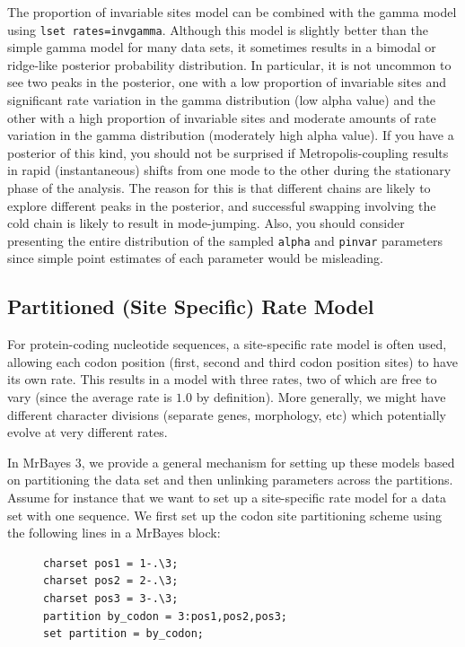 \documentclass[12pt]{book}
\begin{document}
The proportion of invariable sites model can be combined with the gamma model using \texttt{lset
rates=invgamma}. Although this model is slightly better than the simple gamma model for many data
sets, it sometimes results in a bimodal or ridge-like posterior probability distribution. In
particular, it is not uncommon to see two peaks in the posterior, one with a low proportion of
invariable sites and significant rate variation in the gamma distribution (low alpha value) and the
other with a high proportion of invariable sites and moderate amounts of rate variation in the
gamma distribution (moderately high alpha value). If you have a posterior of this kind, you should
not be surprised if Metropolis-coupling results in rapid (instantaneous) shifts from one mode to
the other during the stationary phase of the analysis. The reason for this is that different chains
are likely to explore different peaks in the posterior, and successful swapping involving the cold
chain is likely to result in mode-jumping. Also, you should consider presenting the entire
distribution of the sampled \texttt{alpha} and \texttt{pinvar} parameters since simple point
estimates of each parameter would be misleading.

\subsection{Partitioned (Site Specific) Rate Model}

For protein-coding nucleotide sequences, a site-specific rate model is often used, allowing each
codon position (first, second and third codon position sites) to have its own rate. This results in
a model with three rates, two of which are free to vary (since the average rate is $1.0$ by
definition). More generally, we might have different character divisions (separate genes,
morphology, etc) which potentially evolve at very different rates.

In MrBayes 3, we provide a general mechanism for setting up these models based on partitioning the
data set and then unlinking parameters across the partitions. Assume for instance that we want to
set up a site-specific rate model for a data set with one sequence. We first set up the codon site
partitioning scheme using the following lines in a MrBayes block:

\begin{figure}[h]
\centering
\begin{BVerbatim}[fontsize=\small]
charset pos1 = 1-.\3;
charset pos2 = 2-.\3;
charset pos3 = 3-.\3;
partition by_codon = 3:pos1,pos2,pos3;
set partition = by_codon;
\end{BVerbatim}
\end{figure}
\end{document}
